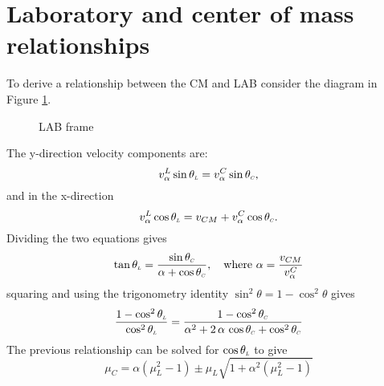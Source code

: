 \documentclass[../main.tex]{subfiles}
\begin{document}
\section{Laboratory and center of mass relationships}
To derive a relationship between the CM and LAB consider the diagram in Figure \ref{fig:lab_com_rel}.
\begin{figure}[!htb]
  \centering
  
  \caption{LAB frame}
  \label{fig:lab_com_rel}
\end{figure}

The y-direction velocity components are:
\begin{equation}
  v_{\alpha}^L \sin \theta_{\scaleto{L}{3pt}} = v_{\alpha}^C \sin \theta_{\scaleto{C}{3pt}},
\end{equation}
and in the x-direction 
\begin{equation}
  v_{\alpha}^L \cos \theta_{\scaleto{L}{3pt}} = v_{CM} + v_{\alpha}^C \cos \theta_{\scaleto{C}{3pt}}.
\end{equation}
Dividing the two equations gives
\begin{equation}
  \tan \theta_{\scaleto{L}{3pt}} = \dfrac{\sin \theta_{\scaleto{C}{3pt}}}{\alpha + \cos \theta_{\scaleto{C}{3pt}}}, \quad \text{where} \,\, \alpha = \dfrac{v_{CM}}{v_{\alpha}^C}
\end{equation}
squaring and using the trigonometry identity $\sin^2 \theta = 1 - \cos^2 \theta$ gives
\begin{equation}
  \dfrac{1 - \cos^2 \theta_{\scaleto{L}{3pt}}}{\cos^2 \theta_{\scaleto{L}{3pt}}} = \dfrac{1 - \cos^2 \theta_{\scaleto{C}{3pt}}}{\alpha^2 + 2 \, \alpha \, \cos \theta_{\scaleto{C}{3pt}} + \cos^2 \theta_{\scaleto{C}{3pt}}}
\end{equation}
The previous relationship can be solved for $\cos \theta_{\scaleto{L}{3pt}}$ to give 
\begin{equation} \label{eqn:lab-com-angle-relationship}
  \boxed{\mu_C = \alpha (\mu_L^2 - 1) \pm \mu_L \sqrt{1 + \alpha^2(\mu_L^2-1)}}
\end{equation}
\end{document}
